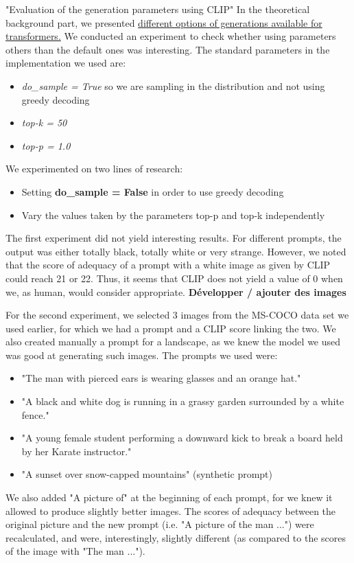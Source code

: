 \documentclass{article}
\begin{document}
"Evaluation of the generation parameters using CLIP"
In the theoretical background part, we presented \hyperlink{options-generation}{different options of generations available for transformers.} We conducted an experiment to check whether using parameters others than the default ones was interesting. The standard parameters in the implementation we used are:
\begin{itemize}
    \item \textit{do\_sample = True} so we are sampling in the distribution and not using greedy decoding
    \item \textit{top-k = 50}
    \item \textit{top-p = 1.0}
\end{itemize}

We experimented on two lines of research:
\begin{itemize}
    \item Setting \textbf{do\_sample = False} in order to use greedy decoding
    \item Vary the values taken by the parameters top-p and top-k independently
\end{itemize}

The first experiment did not yield interesting results. For different prompts, the output was either totally black, totally white or very strange. However, we noted that the score of adequacy of a prompt with a white image as given by CLIP could reach 21 or 22. Thus, it seems that CLIP does not yield a value of 0 when we, as human, would consider appropriate. \textbf{Développer / ajouter des images}

For the second experiment, we selected 3 images from the MS-COCO data set we used earlier, for which we had a prompt and a CLIP score linking the two. We also created manually a prompt for a landscape, as we knew the model we used was good at generating such images. The prompts we used were:
\begin{itemize}
    \item "The man with pierced ears is wearing glasses and an orange hat."
    \item "A black and white dog is running in a grassy garden surrounded by a white fence."
    \item "A young female student performing a downward kick to break a board held by her Karate instructor."
    \item "A sunset over snow-capped mountains" (synthetic prompt)
\end{itemize}
We also added "A picture of" at the beginning of each prompt, for we knew it allowed to produce slightly better images. The scores of adequacy between the original picture and the new prompt (i.e. "A picture of the man ...") were recalculated, and were, interestingly, slightly different (as compared to the scores of the image with "The man ..."). 
\end{document}
